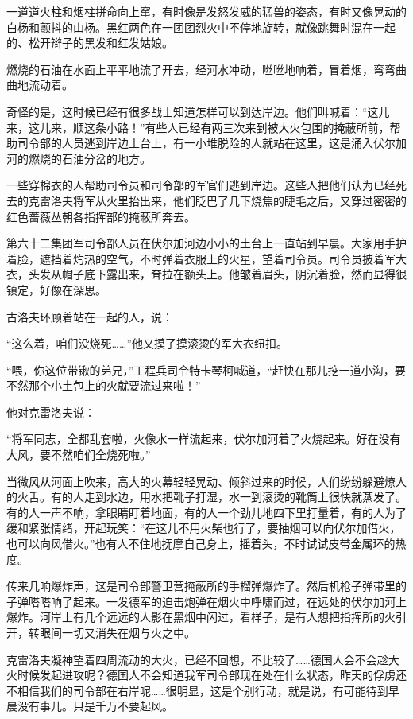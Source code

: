 一道道火柱和烟柱拼命向上窜，有时像是发怒发威的猛兽的姿态，有时又像晃动的白杨和颤抖的山杨。黑红两色在一团团烈火中不停地旋转，就像跳舞时混在一起的、松开辫子的黑发和红发姑娘。

燃烧的石油在水面上平平地流了开去，经河水冲动，咝咝地响着，冒着烟，弯弯曲曲地流动着。

奇怪的是，这时候已经有很多战士知道怎样可以到达岸边。他们叫喊着：“这儿来，这儿来，顺这条小路！”有些人已经有两三次来到被大火包围的掩蔽所前，帮助司令部的人员逃到岸边土台上，有一小堆脱险的人就站在这里，这是涌入伏尔加河的燃烧的石油分岔的地方。

一些穿棉衣的人帮助司令员和司令部的军官们逃到岸边。这些人把他们认为已经死去的克雷洛夫将军从火里抬出来，他们眨巴了几下烧焦的睫毛之后，又穿过密密的红色蔷薇丛朝各指挥部的掩蔽所奔去。

第六十二集团军司令部人员在伏尔加河边小小的土台上一直站到早晨。大家用手护着脸，遮挡着灼热的空气，不时弹着衣服上的火星，望着司令员。司令员披着军大衣，头发从帽子底下露出来，耷拉在额头上。他皱着眉头，阴沉着脸，然而显得很镇定，好像在深思。

古洛夫环顾着站在一起的人，说：

“这么着，咱们没烧死……”他又摸了摸滚烫的军大衣纽扣。

“喂，你这位带锹的弟兄，”工程兵司令特卡琴柯喊道，“赶快在那儿挖一道小沟，要不然那个小土包上的火就要流过来啦！”

他对克雷洛夫说：

“将军同志，全都乱套啦，火像水一样流起来，伏尔加河着了火烧起来。好在没有大风，要不然咱们全烧死啦。”

当微风从河面上吹来，高大的火幕轻轻晃动、倾斜过来的时候，人们纷纷躲避燎人的火舌。有的人走到水边，用水把靴子打湿，水一到滚烫的靴筒上很快就蒸发了。有的人一声不响，拿眼睛盯着地面，有的人一个劲儿地四下里打量着，有的人为了缓和紧张情绪，开起玩笑：“在这儿不用火柴也行了，要抽烟可以向伏尔加借火，也可以向风借火。”也有人不住地抚摩自己身上，摇着头，不时试试皮带金属环的热度。

传来几响爆炸声，这是司令部警卫营掩蔽所的手榴弹爆炸了。然后机枪子弹带里的子弹嗒嗒响了起来。一发德军的迫击炮弹在烟火中呼啸而过，在远处的伏尔加河上爆炸。河岸上有几个远远的人影在黑烟中闪过，看样子，是有人想把指挥所的火引开，转眼间一切又消失在烟与火之中。

克雷洛夫凝神望着四周流动的大火，已经不回想，不比较了……德国人会不会趁大火时候发起进攻呢？德国人不会知道我军司令部现在处在什么状态，昨天的俘虏还不相信我们的司令部在右岸呢……很明显，这是个别行动，就是说，有可能待到早晨没有事儿。只是千万不要起风。

